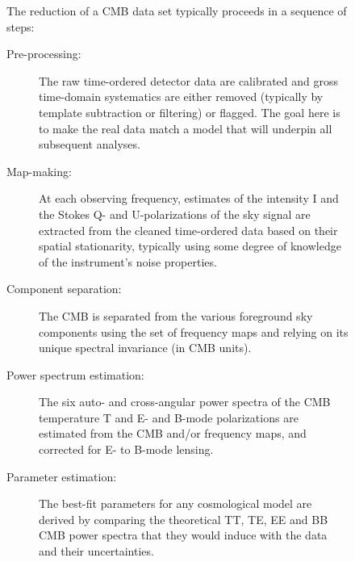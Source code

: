 \begin{figure}[htbp]
\begin{minipage}[h]{0.7\linewidth}
The reduction of a CMB data set typically proceeds in a sequence of steps:
\begin{description}
\item[ Pre-processing:] The raw time-ordered detector data are calibrated and gross time-domain systematics are either removed (typically by template subtraction or filtering) or flagged. The goal here is to make the real data match a model that will underpin all subsequent analyses.
\item[Map-making:] At each observing frequency, estimates of the intensity I and the Stokes Q- and U-polarizations of the sky signal are extracted from the cleaned time-ordered data based on their spatial stationarity, typically using some degree of knowledge of the instrument's noise properties.
\item[Component separation:] The CMB is separated from the various foreground sky components using the set of frequency maps and relying on its unique spectral invariance (in CMB units).
\item[Power spectrum estimation:] The six auto- and cross-angular power spectra of the CMB temperature T and E- and B-mode polarizations are estimated from the CMB and/or frequency maps, and corrected for E- to B-mode lensing.
\item[Parameter estimation:] The best-fit parameters for any cosmological model are derived by comparing the theoretical TT, TE, EE and BB CMB power spectra that they would induce with the data and their uncertainties.
\end{description}
\end{minipage}
\begin{minipage}[h]{0.275\linewidth}
\centering

\end{minipage}
\end{figure}
